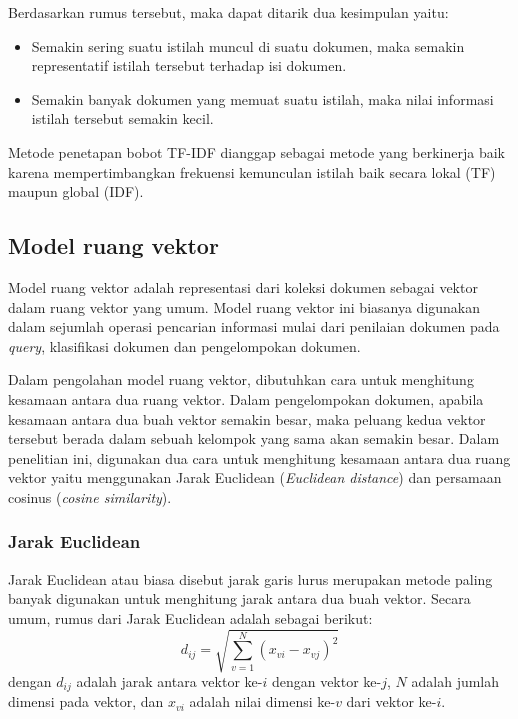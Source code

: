 \documentclass[a4paper,twoside]{article}
\begin{document}
\begin{enumerate}
Berdasarkan rumus tersebut, maka dapat ditarik dua kesimpulan yaitu:
\begin{itemize}
\item Semakin sering suatu istilah muncul di suatu dokumen, maka semakin representatif istilah tersebut terhadap isi dokumen.
\item Semakin banyak dokumen yang memuat suatu istilah, maka nilai informasi istilah tersebut semakin kecil.
\end{itemize}

Metode penetapan bobot TF-IDF dianggap sebagai metode yang berkinerja baik karena mempertimbangkan frekuensi kemunculan istilah baik secara lokal (TF) maupun global (IDF).


\subsection*{Model ruang vektor}
Model ruang vektor adalah representasi dari koleksi dokumen sebagai vektor dalam ruang vektor yang umum. Model ruang vektor ini biasanya digunakan dalam sejumlah operasi pencarian informasi mulai dari penilaian dokumen pada \textit{query}, klasifikasi dokumen dan pengelompokan dokumen.

Dalam pengolahan model ruang vektor, dibutuhkan cara untuk menghitung kesamaan antara dua ruang vektor. Dalam pengelompokan dokumen, apabila kesamaan antara dua buah vektor semakin besar, maka peluang kedua vektor tersebut berada dalam sebuah kelompok yang sama akan semakin besar. Dalam penelitian ini, digunakan dua cara untuk menghitung kesamaan antara dua ruang vektor yaitu menggunakan Jarak Euclidean (\textit{Euclidean distance}) dan persamaan cosinus (\textit{cosine similarity}).

\subsubsection*{Jarak Euclidean}
\label{sub:euclideanDist}
Jarak Euclidean atau biasa disebut jarak garis lurus merupakan metode paling banyak digunakan untuk menghitung jarak antara dua buah vektor. Secara umum, rumus dari Jarak Euclidean adalah sebagai berikut:
\begin{equation}
d_{ij}=\sqrt{\sum_{v=1}^N (x_{vi}-x_{vj})^2}
\end{equation}
dengan $d_{ij}$ adalah jarak antara vektor ke-$i$ dengan vektor ke-$j$, $N$ adalah jumlah dimensi pada vektor, dan $x_{vi}$ adalah nilai dimensi ke-$v$ dari vektor ke-$i$.


\end{enumerate}
\end{document}
